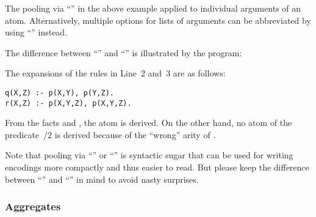 The pooling via ``\code{;}'' in the above example applied to individual 
arguments of an atom.
Alternatively,
multiple options for lists of arguments can be abbreviated
by using ``\code{;;}'' instead.

\begin{example}\label{ex:sep}
The difference between ``\code{;}'' and ``\code{;;}''
is illustrated by the program:%
%

%
The expansions of the rules in Line~2 and~3 are as follows: %
\begin{lstlisting}[numbers=none]
q(X,Z) :- p(X,Y), p(Y,Z). 
r(X,Z) :- p(X,Y,Z), p(X,Y,Z).
\end{lstlisting}
From the facts  and ,
the atom  is derived.
On the other hand,
no atom of the predicate~/$2$ is derived because
of the ``wrong'' arity of .
\eexample
\end{example}

Note that pooling via ``\code{;}'' or ``\code{;;}'' is syntactic sugar
that can be used for writing encodings more compactly and thus easier to read.
But please keep the difference between ``\code{;}'' and ``\code{;;}'' in mind
to avoid nasty surprises.


\subsubsection{Aggregates}\label{subsec:gringo:aggregate}

